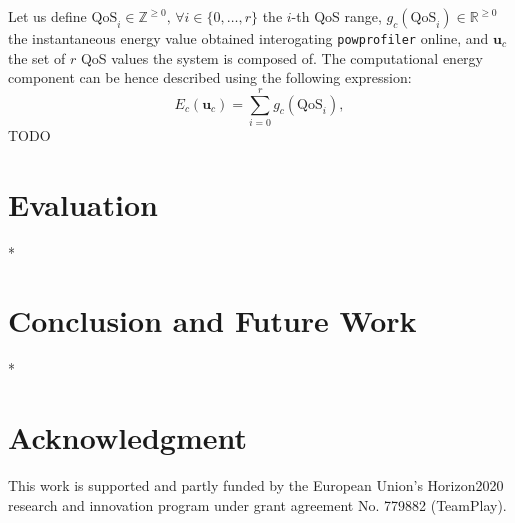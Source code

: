\documentclass[letterpaper,10pt,conference]{ieeeconf}
\newcommand{\stt}[1]{{\small\tt #1}} %
\newcommand{\powprof}{\stt{powprofiler}}
\begin{document}
Let us define $\mathrm{QoS}_i\in\mathbb{Z}^{\geq 0},\,\forall i\in\{0,\dots,r\}$ the $i$-th QoS range, $g_c(\mathrm{QoS}_i)\in\mathbb{R}^{\geq 0}$ the instantaneous energy value obtained interogating \powprof{} online, and $\mathbf{u}_c$ the set of $r$ QoS values the system is composed of. The computational energy component can be hence described using the following expression:
\begin{equation}
  E_c(\mathbf{u}_c)=\sum_{i=0}^{r}{g_c(\mathrm{QoS}_i)},
\end{equation}
TODO



\section{Evaluation}
\label{sec:experimental}

*

\section{Conclusion and Future Work}
\label{sec:conclusion}

*

\section*{Acknowledgment}

This work is supported and partly funded by the European Union's Horizon2020 research and innovation program under grant agreement No. 779882 (TeamPlay).


 
\vspace{0.1ex}
\end{document}
